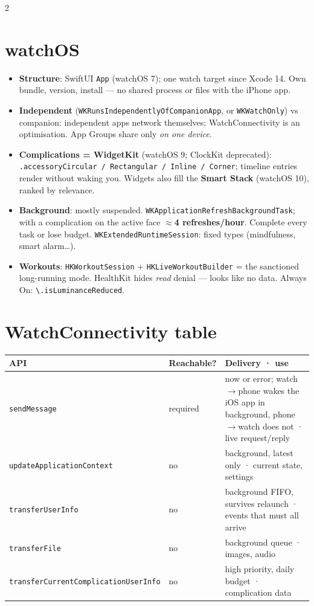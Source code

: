 \documentclass[8pt]{extarticle}
\begin{document}
\begin{multicols}{2}
\raggedright

\section{watchOS}
\begin{itemize}
  \item \textbf{Structure}: SwiftUI \texttt{App} (watchOS 7); one watch target since Xcode 14. Own bundle, version,
        install — no shared process or files with the iPhone app.
  \item \textbf{Independent} (\texttt{WKRunsIndependentlyOfCompanionApp}, or \texttt{WKWatchOnly}) vs companion:
        independent apps network themselves; WatchConnectivity is an optimisation. App Groups share only \emph{on
        one device}.
  \item \textbf{Complications = WidgetKit} (watchOS 9; ClockKit deprecated): \texttt{.accessoryCircular / Rectangular /
        Inline / Corner}; timeline entries render without waking you. Widgets also fill the \textbf{Smart Stack}
        (watchOS 10), ranked by relevance.
  \item \textbf{Background}: mostly suspended. \texttt{WKApplicationRefreshBackgroundTask}; with a complication on the
        active face $\approx$\textbf{4 refreshes/hour}. Complete every task or lose budget.
        \texttt{WKExtendedRuntimeSession}: fixed types (mindfulness, smart alarm\ldots).
  \item \textbf{Workouts}: \texttt{HKWorkoutSession} + \texttt{HKLiveWorkoutBuilder} = the sanctioned long-running mode.
        HealthKit hides \emph{read} denial — looks like no data. Always On: \texttt{\textbackslash.isLuminanceReduced}.
\end{itemize}

\section{WatchConnectivity table}
{\footnotesize
\begin{tabular}{@{}>{\raggedright\arraybackslash}p{24mm}>{\raggedright\arraybackslash}p{12mm}>{\raggedright\arraybackslash}p{36mm}@{}}
\toprule
\textbf{API} & \textbf{Reachable?} & \textbf{Delivery · use} \\
\midrule
\texttt{sendMessage} & required & now or error; watch$\to$phone wakes the iOS app in background, phone$\to$watch does not · live request/reply \\
\texttt{updateApplication\-Context} & no & background, latest only · current state, settings \\
\texttt{transferUserInfo} & no & background FIFO, survives relaunch · events that must all arrive \\
\texttt{transferFile} & no & background queue · images, audio \\
\texttt{transferCurrent\-ComplicationUserInfo} & no & high priority, daily budget · complication data \\
\bottomrule
\end{tabular}}


\end{multicols}
\end{document}
